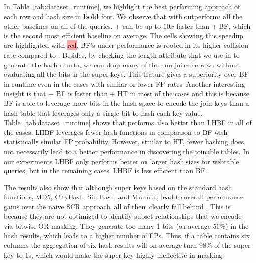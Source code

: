 

In Table~\ref{tab:dataset_runtime}, we highlight the best performing approach of each row and hash size in \textbf{bold} font.
We observe that \system with \hash outperforms all the other baselines on all of the queries.
\system + \hash can be up to $10x$ faster than \system + BF, which is the second most efficient baseline on average.
The cells showing this speedup are highlighted with \colorbox[HTML]{FFABA8}{red}.
BF's under-performance is rooted in its higher collision rate compared to \hash. Besides, by checking the length attribute that we use in \hash to generate the hash results, we can drop many of the non-joinable rows without evaluating all the bits in the super keys. This feature gives \system a superiority over BF in runtime even in the cases with similar or lower FP rates.
Another interesting insight is that \system + BF is faster than \system + HT in most of the cases and this is because BF is able to leverage more bits in the hash space to encode the join keys than a hash table that leverages only a single bit to hash each key value.%
Table~\ref{tab:dataset_runtime} shows that \hash performs also better than LHBF in all of the cases. LHBF leverages fewer hash functions in comparison to BF with statistically similar FP probability. However, similar to HT, fewer hashing does not necessarily lead to a better performance in discovering the joinable tables. In our experiments LHBF only performs better on larger hash sizes for webtable queries, but in the remaining cases, LHBF is less efficient than BF.

The results also show that although super keys based on the standard hash functions, MD5, CityHash, SimHash, and Murmur, lead to overall performance gains over the naive SCR approach, all of them clearly fall behind \hash.
This is because they are not optimized to identify subset relationships that we encode via bitwise OR masking. They generate too many 1 bits (on average $50\%$) in the hash results, which leads to a higher number of FPs.
Thus, if a table contains six columns the aggregation of six hash results will on average turn $98\%$ of the super key to 1s, which would make the super key highly ineffective in masking.

